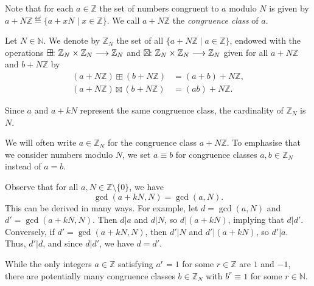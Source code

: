 \documentclass[a4paper, oneside, 12pt]{amsart}
\begin{document}
Note that for each \(a\in \mathbb{Z}\) the set of numbers congruent to \(a\) modulo \(N\) is given by \(a + N \mathbb{Z} \eqdef\{a+ xN \mid x \in \mathbb{Z}\}\).
We call \(a + N \mathbb{Z}\) the \emph{congruence class} of \(a\).

\begin{definition}\label{def:modular-arithmetic}
  Let \( N \in \mathbb{N} \).
  We denote by \( \mathbb{Z}_N \) the set of all \( \{ a + N\mathbb{Z} \mid a \in \mathbb{Z} \} \), endowed with the operations \(\boxplus \from \mathbb{Z}_{N}\times \mathbb{Z}_{N}\to \mathbb{Z}_{N}\) and \(\boxtimes \from \mathbb{Z}_{N} \times \mathbb{Z}_{N} \to \mathbb{Z}_{N}\) given for all \(a+ N \mathbb{Z}\) and \(b + N \mathbb{Z}\) by
  \begin{subequations}
    \begin{align*}
      (a + N\mathbb{Z}) \boxplus (b + N\mathbb{Z}) &= (a + b) + N\mathbb{Z},\\
      (a + N\mathbb{Z}) \boxtimes (b + N\mathbb{Z}) &= (ab) + N\mathbb{Z}.
    \end{align*}
  \end{subequations}
\end{definition}

Since \(a\) and \(a+kN\) represent the same congruence class, the cardinality of \( \mathbb{Z}_{N}\) is \(N\).

\begin{convention}
  We will often write \(a\in \mathbb{Z}_{N}\) for the congruence class \(a+ N \mathbb{Z}\).
  To emphasise that we consider numbers modulo \(N\), we set
  \(a\equiv b\) for congruence classes \(a,b \in \mathbb{Z}_{N}\) instead of \(a = b\).
\end{convention}

\begin{remark}\label{rmk:gcd-as-order-in-mod-arith}
  Observe that for all \( a, N \in \mathbb{Z} \setminus \{0\} \), we have
  \begin{equation*}
    \gcd(a + kN, N) = \gcd(a, N).
  \end{equation*}
  This can be derived in many ways.
  For example, let \( d = \gcd(a, N) \) and \(d' = \gcd(a+kN, N)\).
  Then \( d |a \) and \( d |N \), so \( d |(a + kN) \), implying that \(d| d' \).
  Conversely, if \( d' = \gcd(a + kN, N) \), then \( d' |N \) and \( d' |(a + kN) \), so \( d' |a \).
  Thus, \( d' |d \), and since \( d |d' \), we have \( d = d' \).
\end{remark}

While the only integers \(a\in \mathbb{Z}\) satisfying \(a^{r}=1\) for some \(r\in \mathbb{Z}\) are \(1\) and \(-1\), there are potentially many congruence classes \(b\in \mathbb{Z}_{N}\) with \(b^{r}\equiv 1\) for some \(r \in \mathbb{N}\).
\end{document}

